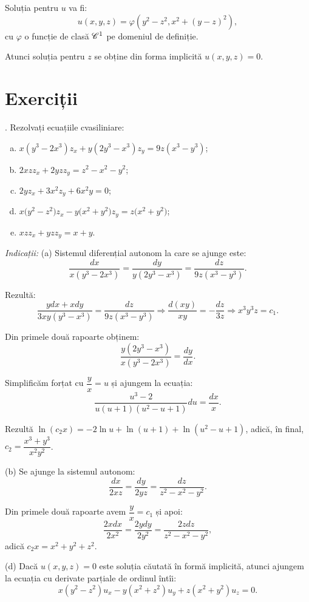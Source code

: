 Soluția pentru $ u $ va fi:
\[
  u(x, y, z) = \varphi(y^2 - z^2, x^2 + (y - z)^2),
\]
cu $ \varphi $ o funcție de clasă $ \mathscr{C}^1 $ pe domeniul de definiție.

Atunci soluția pentru $ z $ se obține din forma implicită $ u(x, y, z) = 0 $.



\section{Exerciții}

\indent{}. Rezolvați ecuațiile cvasiliniare:
\begin{enumerate}[(a)]
\item $x(y^3 - 2x^3)z_x + y(2y^3 - x^3)z_y = 9z(x^3 - y^3) $;
\item $ 2xzz_x + 2yzz_y = z^2 - x^2 - y^2 $;
\item $ 2y z_x + 3x^2 z_y + 6x^2 y = 0 $;
\item $ x \Big( y^2 - z^2 \Big) z_x - y \Big( x^2 + y^2 \Big) z_y = z \Big( x^2 + y^2 \Big) $;
\item $ xz z_x + yz z_y = x + y $.
\end{enumerate}

\emph{Indicații:} (a) Sistemul diferențial autonom la care se ajunge este:
\[
  \dfrac{dx}{x(y^3 - 2x^3)} = \dfrac{dy}{y(2y^3 - x^3)} = \dfrac{dz}{9z(x^3 - y^3)}.
\]

Rezultă:
\[
  \dfrac{ydx + xdy}{3xy(y^3 - x^3)} = \dfrac{dz}{9z(x^3 - y^3)} \Rightarrow %
  \dfrac{d(xy)}{xy} = -\dfrac{dz}{3z} \Rightarrow x^3 y^3 z = c_1.
\]

Din primele două rapoarte obținem:
\[
  \dfrac{y(2y^3 - x^3)}{x(y^3 - 2x^3)} = \dfrac{dy}{dx}.
\]

Simplificăm forțat cu $ \dfrac{y}{x} = u $ și ajungem la ecuația:
\[
  \dfrac{u^3 - 2}{u(u+1)(u^2 - u + 1)} du = \dfrac{dx}{x}.
\]

Rezultă $ \ln(c_2 x) = -2\ln u + \ln(u + 1) + \ln(u^2 - u + 1) $, adică, în final,
$ c_2 = \dfrac{x^3 + y^3}{x^2 y^2} $.

(b) Se ajunge la sistemul autonom:
\[
  \dfrac{dx}{2xz} = \dfrac{dy}{2yz} = \dfrac{dz}{z^2 - x^2 - y^2}.
\]

Din primele două rapoarte avem $ \dfrac{y}{x} = c_1 $ și apoi:
\[
  \dfrac{2xdx}{2x^2} = \dfrac{2ydy}{2y^2} = \dfrac{2zdz}{z^2 - x^2 - y^2},
\]
adică $ c_2x = x^2 + y^2 + z^2 $.

(d) Dacă $ u(x, y, z) = 0 $ este soluția căutată în formă implicită, atunci ajungem
la ecuația cu derivate parțiale de ordinul întîi:
\[
  x(y^2 - z^2)u_x - y(x^2 + z^2) u_y + z(x^2 + y^2) u_z = 0.
\]

